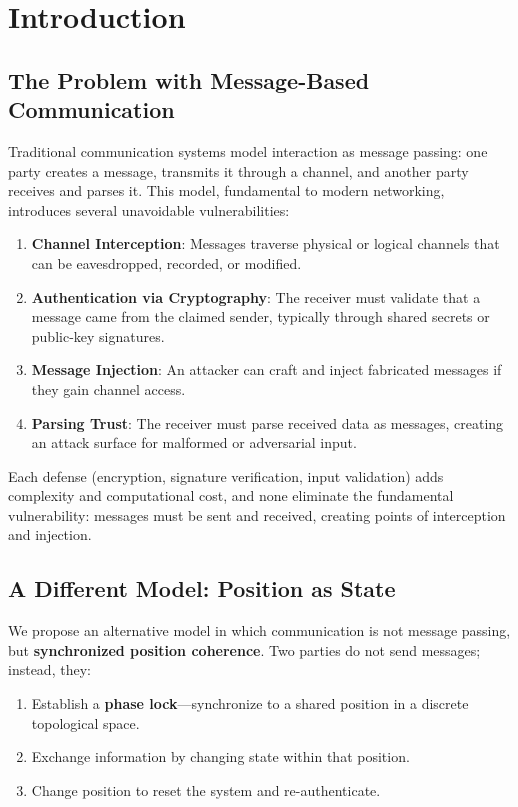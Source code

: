 \documentclass[11pt,a4paper]{article}
\theoremstyle{definition}
\begin{document}
\section{Introduction}

\subsection{The Problem with Message-Based Communication}

Traditional communication systems model interaction as message passing: one party creates a message, transmits it through a channel, and another party receives and parses it. This model, fundamental to modern networking, introduces several unavoidable vulnerabilities:

\begin{enumerate}
\item \textbf{Channel Interception}: Messages traverse physical or logical channels that can be eavesdropped, recorded, or modified.
\item \textbf{Authentication via Cryptography}: The receiver must validate that a message came from the claimed sender, typically through shared secrets or public-key signatures.
\item \textbf{Message Injection}: An attacker can craft and inject fabricated messages if they gain channel access.
\item \textbf{Parsing Trust}: The receiver must parse received data as messages, creating an attack surface for malformed or adversarial input.
\end{enumerate}

Each defense (encryption, signature verification, input validation) adds complexity and computational cost, and none eliminate the fundamental vulnerability: messages must be sent and received, creating points of interception and injection.

\subsection{A Different Model: Position as State}

We propose an alternative model in which communication is not message passing, but \textbf{synchronized position coherence}. Two parties do not send messages; instead, they:

\begin{enumerate}
\item Establish a \textbf{phase lock}—synchronize to a shared position in a discrete topological space.
\item Exchange information by changing state within that position.
\item Change position to reset the system and re-authenticate.
\end{enumerate}
\end{document}
